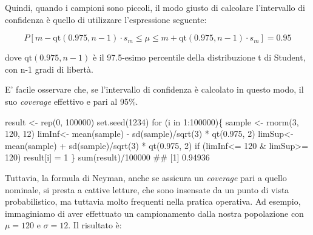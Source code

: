\documentclass[a4paper,12pt,oneside]{book}
\newenvironment{Shaded}{\begin{snugshade}}{\end{snugshade}}
\newcommand{\DecValTok}[1]{#1}
\newcommand{\FloatTok}[1]{#1}
\newcommand{\SpecialCharTok}[1]{#1}
\newcommand{\DocumentationTok}[1]{#1}
\newcommand{\OtherTok}[1]{#1}
\newcommand{\FunctionTok}[1]{#1}
\newcommand{\ControlFlowTok}[1]{#1}
\newcommand{\NormalTok}[1]{#1}
\begin{document}
Quindi, quando i campioni sono piccoli, il modo giusto di calcolare l'intervallo di confidenza è quello di utilizzare l'espressione seguente:

\[P \left[ m - \textrm{qt}(0.975,n - 1) \cdot s_m \le \mu  \le m + \textrm{qt}(0.975,n - 1) \cdot s_m \right] = 0.95\]

dove \(\textrm{qt}(0.975,n - 1)\) è il 97.5-esimo percentile della distribuzione t di Student, con n-1 gradi di libertà.

E' facile osservare che, se l'intervallo di confidenza è calcolato in questo modo, il suo \emph{coverage} effettivo e pari al 95\%.

\begin{Shaded}
\begin{Highlighting}[]
\NormalTok{result }\OtherTok{\textless{}{-}} \FunctionTok{rep}\NormalTok{(}\DecValTok{0}\NormalTok{, }\DecValTok{100000}\NormalTok{)}
\FunctionTok{set.seed}\NormalTok{(}\DecValTok{1234}\NormalTok{)}
\ControlFlowTok{for}\NormalTok{ (i }\ControlFlowTok{in} \DecValTok{1}\SpecialCharTok{:}\DecValTok{100000}\NormalTok{)\{}
\NormalTok{  sample }\OtherTok{\textless{}{-}} \FunctionTok{rnorm}\NormalTok{(}\DecValTok{3}\NormalTok{, }\DecValTok{120}\NormalTok{, }\DecValTok{12}\NormalTok{)}
\NormalTok{  limInf}\OtherTok{\textless{}{-}} \FunctionTok{mean}\NormalTok{(sample) }\SpecialCharTok{{-}} \FunctionTok{sd}\NormalTok{(sample)}\SpecialCharTok{/}\FunctionTok{sqrt}\NormalTok{(}\DecValTok{3}\NormalTok{) }\SpecialCharTok{*} \FunctionTok{qt}\NormalTok{(}\FloatTok{0.975}\NormalTok{, }\DecValTok{2}\NormalTok{) }
\NormalTok{  limSup}\OtherTok{\textless{}{-}} \FunctionTok{mean}\NormalTok{(sample) }\SpecialCharTok{+} \FunctionTok{sd}\NormalTok{(sample)}\SpecialCharTok{/}\FunctionTok{sqrt}\NormalTok{(}\DecValTok{3}\NormalTok{) }\SpecialCharTok{*} \FunctionTok{qt}\NormalTok{(}\FloatTok{0.975}\NormalTok{, }\DecValTok{2}\NormalTok{) }
  \ControlFlowTok{if}\NormalTok{ (limInf}\SpecialCharTok{\textless{}=} \DecValTok{120} \SpecialCharTok{\&}\NormalTok{ limSup}\SpecialCharTok{\textgreater{}=} \DecValTok{120}\NormalTok{) result[i] }\OtherTok{=} \DecValTok{1}
\NormalTok{\}}
\FunctionTok{sum}\NormalTok{(result)}\SpecialCharTok{/}\DecValTok{100000}
\DocumentationTok{\#\# [1] 0.94936}
\end{Highlighting}
\end{Shaded}

Tuttavia, la formula di Neyman, anche se assicura un \emph{coverage} pari a quello nominale, si presta a cattive letture, che sono insensate da un punto di vista probabilistico, ma tuttavia molto frequenti nella pratica operativa. Ad esempio, immaginiamo di aver effettuato un campionamento dalla nostra popolazione con \(\mu = 120\) e \(\sigma = 12\). Il risultato è:
\end{document}

